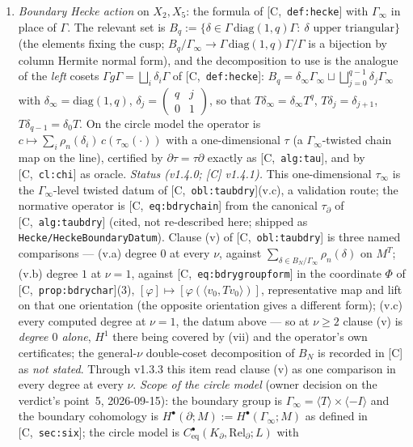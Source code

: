 \documentclass[11pt]{article}
\theoremstyle{remark}
\newcommand{\Ga}{\Gamma}
\newcommand{\smat}[4]{\begin{pmatrix} #1 & #2 \\ #3 & #4 \end{pmatrix}}
\newcommand{\HA}[1]{[C,~\texttt{#1}]}      %
\begin{document}
\begin{enumerate}[label=(A\arabic*)]
\item\label{add:bdry} \emph{Boundary Hecke action} on $X_2,X_5$: the formula of \HA{def:hecke}
  with $\Ga_\infty$ in place of $\Ga$. The relevant set is
  $B_q:=\{\delta\in\Ga\,\mathrm{diag}(1,q)\Ga:\ \delta\text{ upper triangular}\}$ (the elements
  fixing the cusp; $B_q/\Ga_\infty\to\Ga\,\mathrm{diag}(1,q)\Ga/\Ga$ is a bijection by column
  Hermite normal form), and the decomposition to use is the analogue of the \emph{left} cosets
  $\Ga g\Ga=\bigsqcup_i\delta_i\Ga$ of \HA{def:hecke}:
  $B_q=\delta_\infty\Ga_\infty\sqcup\bigsqcup_{j=0}^{q-1}\delta_j\Ga_\infty$ with
  $\delta_\infty=\mathrm{diag}(1,q)$, $\delta_j=\smat{q}{j}{0}{1}$, so that
  $T\delta_\infty=\delta_\infty T^q$, $T\delta_j=\delta_{j+1}$, $T\delta_{q-1}=\delta_0T$. On the
  circle model the operator is $c\mapsto\sum_i\rho_n(\delta_i)\,c(\tau_\infty(\cdot))$ with a
  one-dimensional $\tau$ (a $\Ga_\infty$-twisted chain map on the line), certified by
  $\partial\tau=\tau\partial$ exactly as \HA{alg:tau}, and by \HA{cl:chi} as oracle.
  \emph{Status (v1.4.0; [C] v1.4.1).} This one-dimensional $\tau_\infty$ is the
  $\Ga_\infty$-level twisted datum of \HA{obl:taubdry}(v.c), a validation route; the normative
  operator is \HA{eq:bdrychain} from the canonical $\tau_\partial$ of \HA{alg:taubdry} (cited,
  not re-described here; shipped as \texttt{Hecke/HeckeBoundaryDatum}). Clause (v) of
  \HA{obl:taubdry} is three named comparisons --- (v.a) degree $0$ at every $\nu$, against
  $\sum_{\delta\in B_N/\Ga_\infty}\rho_n(\delta)$ on $M^T$; (v.b) degree $1$ at $\nu=1$, against
  \HA{eq:bdrygroupform} in the coordinate $\Phi$ of \HA{prop:bdrychar}(3),
  $[\varphi]\mapsto[\varphi(\langle v_0,Tv_0\rangle)]$, representative map and lift on that one
  orientation (the opposite orientation gives a different form); (v.c) every computed degree at
  $\nu=1$, the datum above --- so at $\nu\ge2$ clause (v) is \emph{degree $0$ alone}, $H^1$
  there being covered by (vii) and the operator's own certificates; the general-$\nu$
  double-coset decomposition of $B_N$ is recorded in [C] as \emph{not stated}. Through v1.3.3
  this item read clause (v) as one comparison in every degree at every $\nu$.
  \emph{Scope of the circle model} (owner decision on the verdict's point~5, 2026-09-15): the
  boundary group is $\Ga_\infty=\langle T\rangle\times\langle-I\rangle$ and the boundary cohomology
  is $H^\bullet(\partial;M):=H^\bullet(\Ga_\infty;M)$ as defined in \HA{sec:six}; the circle
  model is $C^\bullet_{\mathrm{eq}}(K_\partial,\mathrm{Rel}_\partial;L)$ with

\end{enumerate}
\end{document}
